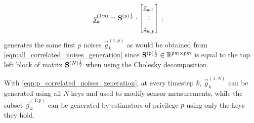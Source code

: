 \documentclass[conference]{IEEEtran}
\theoremstyle{definition}
\theoremstyle{remark}
\begin{document}
\begin{equation}\label{eqn:p_correlated_noises_generation}
  \vec{g}_k^{(1:p)}=
  \mat{S}^{(p)\frac{1}{2}}\cdot
  \begin{bmatrix}
    \vec{z}_{k,1}\\
    \vdots\\
    \vec{z}_{k,p}
  \end{bmatrix}\,,
\end{equation}
generates the same first $p$ noises $\vec{g}_k^{(1:p)}$ as would be obtained from \eqref{eqn:all_correlated_noises_generation} since ${{\mathbf{S}}}^{(p)\frac{1}{2}}\in\mathbb{R}^{pm\times pm}$ is equal to the top left block of matrix ${{\mathbf{S}}}^{(N)\frac{1}{2}}$ when using the Cholesky decomposition.

With \eqref{eqn:p_correlated_noises_generation}, at every timestep $k$, $\vec{g}_k^{(1:N)}$ can be generated using all $N$ keys and used to modify sensor measurements, while the subset $\vec{g}_k^{(1:p)}$ can be generated by estimators of privilege $p$ using only the keys they hold.

% 
% 
\end{document}
